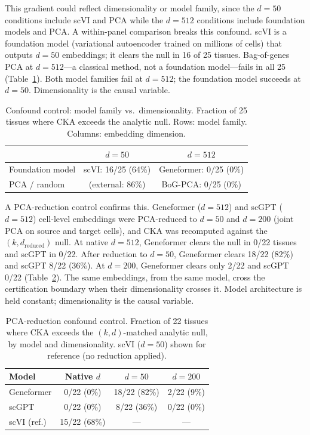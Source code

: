 \documentclass[11pt]{article}
\begin{document}
This gradient could reflect dimensionality or model family, since the
$d = 50$ conditions include scVI and PCA while the $d = 512$ conditions
include foundation models and PCA. A within-panel comparison breaks
this confound. scVI is a foundation model (variational autoencoder
trained on millions of cells) that outputs $d = 50$ embeddings; it
clears the null in 16 of 25 tissues. Bag-of-genes PCA at $d = 512$---a
classical method, not a foundation model---fails in all 25
(Table~\ref{tab:confound}). Both model families fail at $d = 512$; the
foundation model succeeds at $d = 50$. Dimensionality is the causal
variable.

\begin{table}[t]
\centering
\caption{Confound control: model family vs.\ dimensionality. Fraction of
25 tissues where CKA exceeds the analytic null. Rows: model family.
Columns: embedding dimension.}
\label{tab:confound}
\small
\begin{tabular}{@{}lcc@{}}
\toprule
& $d = 50$ & $d = 512$ \\
\midrule
Foundation model & scVI: 16/25 (64\%) & Geneformer: 0/25 (0\%) \\
PCA / random     & (external: 86\%)   & BoG-PCA: 0/25 (0\%) \\
\bottomrule
\end{tabular}
\end{table}

A PCA-reduction control confirms this. Geneformer ($d = 512$) and
scGPT ($d = 512$) cell-level embeddings were PCA-reduced to $d = 50$
and $d = 200$ (joint PCA on source and target cells), and CKA was
recomputed against the $(k, d_{\mathrm{reduced}})$ null. At native
$d = 512$, Geneformer clears the null in 0/22 tissues and scGPT in
0/22. After reduction to $d = 50$, Geneformer clears 18/22 (82\%) and
scGPT 8/22 (36\%). At $d = 200$, Geneformer clears only 2/22 and scGPT
0/22 (Table~\ref{tab:pca_reduction}). The same embeddings, from the
same model, cross the certification boundary when their dimensionality
crosses it. Model architecture is held constant; dimensionality is the
causal variable.

\begin{table}[t]
\centering
\caption{PCA-reduction confound control. Fraction of 22 tissues where
CKA exceeds the $(k, d)$-matched analytic null, by model and
dimensionality. scVI ($d = 50$) shown for reference (no reduction
applied).}
\label{tab:pca_reduction}
\small
\begin{tabular}{@{}lccc@{}}
\toprule
Model & Native $d$ & $d = 50$ & $d = 200$ \\
\midrule
Geneformer      & 0/22 (0\%)  & 18/22 (82\%) & 2/22 (9\%) \\
scGPT           & 0/22 (0\%)  & 8/22 (36\%)  & 0/22 (0\%) \\
scVI (ref.)     & 15/22 (68\%) & ---         & --- \\
\bottomrule
\end{tabular}
\end{table}
\end{document}
